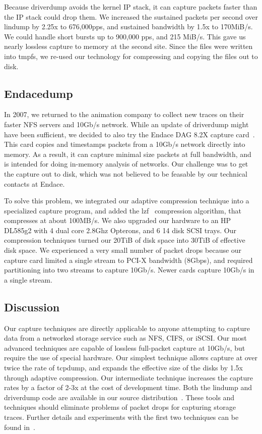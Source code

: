 Because driverdump avoids the kernel IP stack, it can
capture packets faster than the IP stack could drop them.
We increased the sustained packets per second over lindump by 2.25x to
676,000pps, and sustained bandwidth by 1.5x to 170MiB/s.  We could
handle short bursts up to 900,000 pps, and 215 MiB/s.  This gave us
nearly lossless capture to memory at the second site.  Since the files
were written into tmpfs, we re-used our technology for compressing and
copying the files out to disk.

\subsection{Endacedump}

In 2007, we returned to the animation company to collect new traces on
their faster NFS servers and 10Gb/s network.  While an update of
driverdump might have been sufficient, we decided to also try the
Endace DAG 8.2X capture card~\cite{endace-cards}.  This card copies
and timestamps packets from a 10Gb/s network directly into memory.  As
a result, it can capture minimal size packets at full bandwidth, and
is intended for doing in-memory analysis of networks.  Our challenge
was to get the capture out to disk, which was not believed to be
feasable by our technical contacts at Endace.

To solve this problem, we integrated our adaptive compression
technique into a specialized capture program, and added the
lzf~\cite{lzf} compression algorithm, that compresses at about
100MB/s.  We also upgraded our hardware to an HP DL585g2 with 4 dual
core 2.8Ghz Opterons, and 6 14 disk SCSI trays.  Our compression
techniques turned our 20TiB of disk space into 30TiB of effective disk
space.  We experienced a very small number of packet drops because our
capture card limited a single stream to PCI-X bandwidth (8Gbps), and
required partitioning into two streams to capture 10Gb/s.  Newer cards
capture 10Gb/s in a single stream.

\subsection{Discussion}

Our capture techniques are directly applicable to anyone attempting to
capture data from a networked storage service such as NFS, CIFS, or
iSCSI.  Our most advanced techniques are capable of lossless
full-packet capture at 10Gb/s, but require the use of special hardware.
Our simplest technique allows capture at over twice the rate of
tcpdump, and expands the effective size of the disks by 1.5x through
adaptive compression. Our intermediate technique increases the capture
rates by a factor of 2-3x at the cost of development time.  Both the
lindump and driverdump code are available in our source
distribution~\cite{DSOpenSource}.  These tools and techniques should
eliminate problems of packet drops for capturing storage traces.
Further details and
experiments with the first two techniques can be found
in~\cite{Anderson06network-tracing}.
